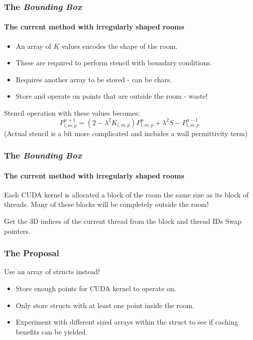 \documentclass{beamer}
\begin{document}
\begin{frame}
\frametitle{The \emph{Bounding Box}}
\framesubtitle{The current method with irregularly shaped rooms}
	\begin{itemize}
		\item An array of $K$ values encodes the shape of the room.
		\item These are required to perform stencil with boundary conditions.
		\item Requires another array to be stored - can be chars.
		\item Store and operate on points that are outside the room - waste!
	\end{itemize}
	Stencil operation with these values becomes:
	\begin{equation}
\label{equation:stencil-boundary}
P_{l,m,p}^{n+1} = (2 - \lambda^2 K_{l,m,p} )P_{l,m,p}^{n} + \lambda^2 S - P_{l,m,p}^{n-1}
\end{equation}
(Actual stencil is a bit more complicated and includes a wall permittivity term)
\end{frame}



\begin{frame}
\frametitle{The \emph{Bounding Box}}
\framesubtitle{The current method with irregularly shaped rooms}
Each CUDA kernel is allocated a block of the room the same size as its block of threads.
Many of these blocks will be completely outside the room!
\IncMargin{1em}
\begin{algorithm}[H]
\footnotesize
 Get the 3D indices of the current thread from the block and thread IDs\;
 Swap pointers.
 \caption{CUDA kernel for update on an irregularly shaped room.}
\end{algorithm}
\end{frame}


\begin{frame}
	\frametitle{The Proposal}
	Use an array of structs instead!
	\begin{itemize}
		\item Store enough points for CUDA kernel to operate on.
		\item Only store structs with at least one point inside the room.
		\item Experiment with different sized arrays within the struct to see if caching benefits can be yielded.
	\end{itemize}
\end{frame}  
  
\end{document}
